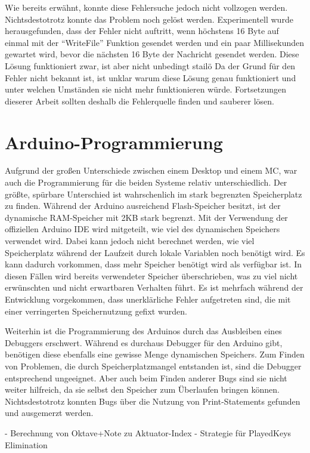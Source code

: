 Wie bereits erwähnt, konnte diese Fehlersuche jedoch nicht vollzogen werden.
Nichtsdestotrotz konnte das Problem noch gelöst werden.
Experimentell wurde herausgefunden, dass der Fehler nicht auftritt, wenn höchstens 16 Byte auf einmal mit der \enquote{WriteFile} Funktion gesendet werden und ein paar Millisekunden gewartet wird, bevor die nächsten 16 Byte der Nachricht gesendet werden.
Diese Lösung funktioniert zwar, ist aber nicht unbedingt stailö
Da der Grund für den Fehler nicht bekannt ist, ist unklar warum diese Lösung genau funktioniert und unter welchen Umständen sie nicht mehr funktionieren würde.
Fortsetzungen dieserer Arbeit sollten deshalb die Fehlerquelle finden und sauberer lösen.


\section{Arduino-Programmierung} \label{umsetzungSW-MC}

Aufgrund der großen Unterschiede zwischen einem Desktop und einem \ac{MC}, war auch die Programmierung für die beiden Systeme relativ unterschiedlich.
Der größte, spürbare Unterschied ist wahrschenlich im stark begrenzten Speicherplatz zu finden.
Während der Arduino ausreichend Flash-Speicher besitzt, ist der dynamische RAM-Speicher mit 2KB stark begrenzt.
Mit der Verwendung der offiziellen Arduino IDE wird mitgeteilt, wie viel des dynamischen Speichers verwendet wird.
Dabei kann jedoch nicht berechnet werden, wie viel Speicherplatz während der Laufzeit durch lokale Variablen noch benötigt wird.
Es kann dadurch vorkommen, dass mehr Speicher benötigt wird als verfügbar ist.
In diesen Fällen wird bereits verwendeter Speicher überschrieben, was zu viel nicht erwünschten und nicht erwartbaren Verhalten führt.
Es ist mehrfach während der Entwicklung vorgekommen, dass unerklärliche Fehler aufgetreten sind, die mit einer verringerten Speichernutzung gefixt wurden.

Weiterhin ist die Programmierung des Arduinos durch das Ausbleiben eines Debuggers erschwert.
Während es durchaus Debugger für den Arduino gibt, benötigen diese ebenfalls eine gewisse Menge dynamischen Speichers.
Zum Finden von Problemen, die durch Speicherplatzmangel entstanden ist, sind die Debugger entsprechend ungeeignet.
Aber auch beim Finden anderer Bugs sind sie nicht weiter hilfreich, da sie selbst den Speicher zum Überlaufen bringen können.
Nichtsdestotrotz konnten Bugs über die Nutzung von Print-Statements gefunden und ausgemerzt werden.


- Berechnung von Oktave+Note zu Aktuator-Index \newline
- Strategie für PlayedKeys Elimination \newline

